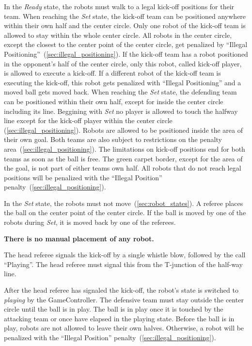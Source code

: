 In the \textit{Ready} state, the robots must walk to a legal kick-off positions for their team.
When reaching the \textit{Set} state, the kick-off team can be positioned anywhere within their own half and the center circle. Only one robot of the kick-off team is allowed to stay within the whole center circle. All robots in the center circle, except the closest to the center point of the center circle, get penalized by ``Illegal Positioning''~(\cf \cref{sec:illegal_positioning}). If the kick-off team has a robot positioned in the opponent's half of the center circle, only this robot, called kick-off player, is allowed to execute a kick-off. If a different robot of the kick-off team is executing the kick-off, this robot gets penalized with ``Illegal Positioning'' and a moved ball gets moved back.
When reaching the \textit{Set} state, the defending team can be positioned within their own half, except for inside the center circle including its line.
Beggining with \textit{Set} no player is allowed to touch the halfway line except for the kick-off player within the center circle (\cf \cref{sec:illegal_positioning}). Robots are allowed to be positioned inside the area of their own goal.
Both teams are also subject to restrictions on the penalty area~(\cf \cref{sec:illegal_positioning}).
The limitations on kick-off positions end for both teams as soon as the ball is free.
The green carpet border, except for the area of the goal, is not part of either teams own half. All robots that do not reach legal positions will be penalized with the ``Illegal Position'' penalty~(\cf \cref{sec:illegal_positioning}).

In the \emph{Set} state, the robots must not move~(\cf \cref{sec:robot_states}). A referee places the ball on the center point of the center circle. If the ball is moved by one of the robots during \textit{Set}, it is moved back by one of the referees.

\textbf{There is no manual placement of any robot.}

The head referee signals the kick-off by a single whistle blow, followed by the call ``Playing''. The head referee must signal this from the T-junction of the half-way line.

After the head referee has signaled the kick-off, the robot's state is switched to \emph{playing} by the GameController.
The defensive team must stay outside the center circle until the ball is in play. The ball is in play once it is touched by the attacking team or once \emph{\KickOffBallFreeTime} have elapsed in the playing state. Before the ball is in play, robots are not allowed to leave their own halves. Otherwise, a robot will be penalized with the ``Illegal Position'' penalty~(\cf \cref{sec:illegal_positioning}).

